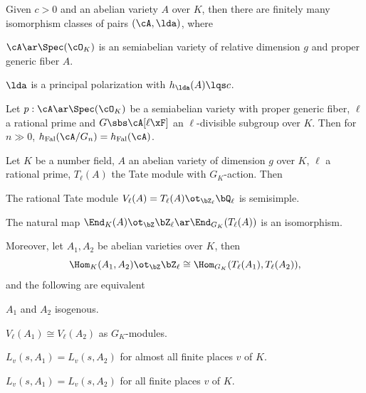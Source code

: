 \documentclass[a4paper, twoside]{article}
\begin{document}
\begin{thm}
	Given $c>0$ and an abelian variety $A$ over $K$, then there are finitely many isomorphism classes of pairs $(\cA,\lda)$, where
	\begin{itm}
		\item $\cA\ar\Spec(\cO_{K})$ is an semiabelian variety of relative dimension $g$ and proper generic fiber $A$.
		\item $\lda$ is a principal polarization with $h_{\lda}(A)\lqs c$.
	\end{itm}
\end{thm}

\begin{thm}
	Let $p:\cA\ar\Spec(\cO_{K})$ be a semiabelian variety with proper generic fiber, $\ell$ a rational prime and $G\sbs \cA[\ell\xF]$ an $\ell$-divisible subgroup over $K$. Then for $n\gg0$, $h_{\text{Fal}}(\cA/G_{n})=h_{\text{Fal}}(\cA)$.
\end{thm}

\begin{thm}
	Let $K$ be a number field, $A$ an abelian variety of dimension $g$ over $K$, $\ell$ a rational prime, $T_{\ell}(A)$ the Tate module with $G_{K}$-action. Then
	\begin{itm}
		\item The rational Tate module $V_{\ell}(A)=T_{\ell}(A)\ot_{\bZ_{\ell}}\bQ_{\ell}$ is semisimple.
		\item The natural map $\End_{K}(A)\ot_{\bZ}\bZ_{\ell}\ar\End_{G_{K}}(T_{\ell}(A))$ is an isomorphism.
	\end{itm}

	Moreover, let $A_{1},A_{2}$ be abelian varieties over $K$, then
	\[
		\Hom_{K}(A_{1},A_{2})\ot_{\bZ}\bZ_{\ell}\cong\Hom_{G_{K}}(T_{\ell}(A_{1}),T_{\ell}(A_{2})),
	\]
	and the following are equivalent
	\begin{enr}
		\item $A_{1}$ and $A_{2}$ isogenous.
		\item $V_{\ell}(A_{1})\cong V_{\ell}(A_{2})$ as $G_{K}$-modules.
		\item $L_{v}(s,A_{1})=L_{v}(s,A_{2})$ for almost all finite places $v$ of $K$.
		\item $L_{v}(s,A_{1})=L_{v}(s,A_{2})$ for all finite places $v$ of $K$.
	\end{enr}

\end{thm}
\end{document}
